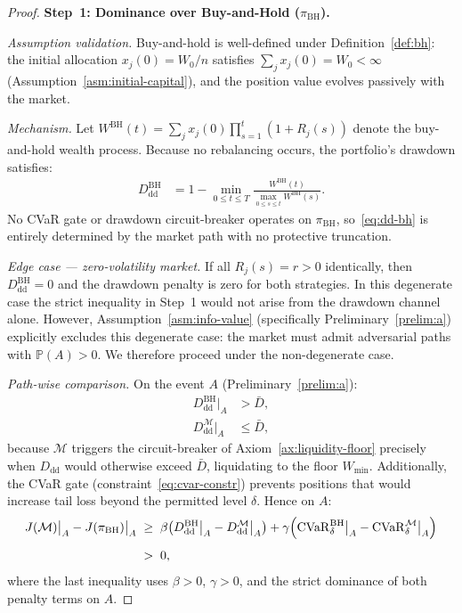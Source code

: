 \documentclass[12pt,openany]{book}
\numberwithin{equation}{chapter}
\theoremstyle{plain}
\theoremstyle{definition}
\theoremstyle{remark}
\numberwithin{equation}{chapter}
\theoremstyle{plain}
\begin{document}
\begin{proof}
\bigskip
\noindent\textbf{Step~1: Dominance over Buy-and-Hold
($\pi_{\mathrm{BH}}$).}

\medskip
\noindent\textit{Assumption validation.}
Buy-and-hold is well-defined under Definition~\ref{def:bh}: the
initial allocation $x_j(0) = W_0/n$ satisfies
$\sum_j x_j(0) = W_0 < \infty$ (Assumption~\ref{asm:initial-capital}),
and the position value evolves passively with the market.

\medskip
\noindent\textit{Mechanism.}
Let $W^{\mathrm{BH}}(t) = \sum_j x_j(0)\prod_{s=1}^{t}(1+R_j(s))$
denote the buy-and-hold wealth process.  Because no rebalancing
occurs, the portfolio's drawdown satisfies:
\begin{align}
  D_{\mathrm{dd}}^{\mathrm{BH}}
  &= 1 - \min_{0 \le t \le T}
    \frac{W^{\mathrm{BH}}(t)}{\max_{0 \le s \le t}W^{\mathrm{BH}}(s)}.
  \label{eq:dd-bh}
\end{align}
No CVaR gate or drawdown circuit-breaker operates on
$\pi_{\mathrm{BH}}$, so~\eqref{eq:dd-bh} is entirely determined
by the market path with no protective truncation.

\medskip
\noindent\textit{Edge case — zero-volatility market.}
If all $R_j(s) = r > 0$ identically, then $D_{\mathrm{dd}}^{\mathrm{BH}}
= 0$ and the drawdown penalty is zero for both strategies.
In this degenerate case the strict inequality in Step~1 would not
arise from the drawdown channel alone.  However, Assumption~\ref{asm:info-value}
(specifically Preliminary~\ref{prelim:a}) explicitly excludes
this degenerate case: the market must admit adversarial paths with
$\mathbb{P}(A) > 0$.  We therefore proceed under the non-degenerate
case.

\medskip
\noindent\textit{Path-wise comparison.}
On the event $A$ (Preliminary~\ref{prelim:a}):
\begin{align}
  D_{\mathrm{dd}}^{\mathrm{BH}}\big|_A &> \bar{D}, \\[4pt]
  D_{\mathrm{dd}}^{\mathcal{M}}\big|_A  &\le \bar{D},
\end{align}
because $\mathcal{M}$ triggers the circuit-breaker of
Axiom~\ref{ax:liquidity-floor} precisely when $D_{\mathrm{dd}}$
would otherwise exceed $\bar{D}$, liquidating to the floor
$W_{\min}$.  Additionally, the CVaR gate
(constraint~\eqref{eq:cvar-constr}) prevents positions that would
increase tail loss beyond the permitted level $\delta$.  Hence on $A$:
\begin{align}
  J(\mathcal{M})\big|_A - J(\pi_{\mathrm{BH}})\big|_A
  &\;\ge\;
  \beta\!\left(
    D_{\mathrm{dd}}^{\mathrm{BH}}\big|_A
    - D_{\mathrm{dd}}^{\mathcal{M}}\big|_A
  \right)
  + \gamma\!\left(
    \mathrm{CVaR}_\delta^{\mathrm{BH}}\big|_A
    - \mathrm{CVaR}_\delta^{\mathcal{M}}\big|_A
  \right)
  \notag \\[4pt]
  &\;>\; 0,
  \label{eq:step1-pathwise}
\end{align}
where the last inequality uses $\beta > 0$, $\gamma > 0$, and
the strict dominance of both penalty terms on $A$.


\end{proof}
\end{document}
